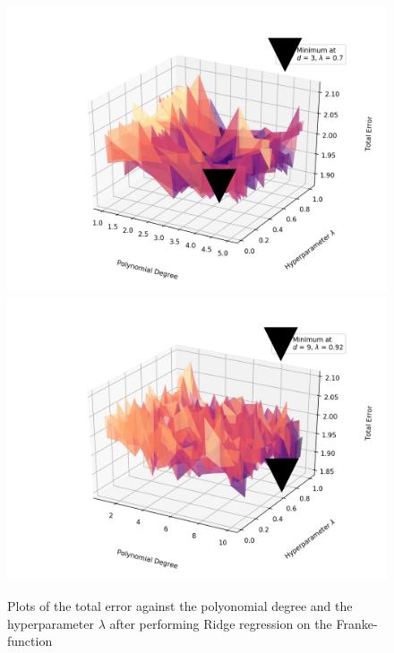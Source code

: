 \documentclass[a4paper,10pt,english]{article}
\begin{document}
\begin{figure}[H]
	\centering 
	\includegraphics[scale=0.47]{../franke_output/part_D_5.png}
	\includegraphics[scale=0.47]{../franke_output/part_D_5_highdeg.png}
	\caption{
		Plots of the total error against the polyonomial degree and the hyperparameter $\lambda$ after performing Ridge regression on the Franke-function 
	}
	\label{part_d5}
\end{figure}
\end{document}
